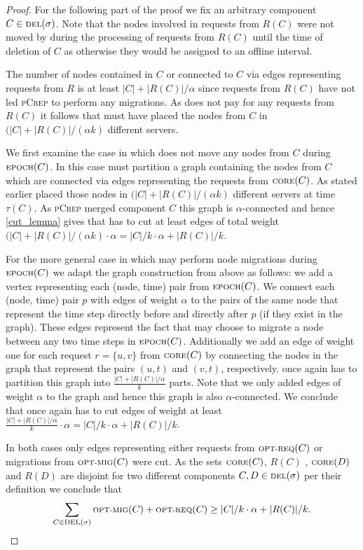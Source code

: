 \documentclass[a4paper,UKenglish,cleveref, autoref, thm-restate,authorcolumns]{lipics-v2019}
\newcommand{\adjDel}{\textsc{pCrep}}
\newcommand{\optmig}{\text{\scriptsize OPT-MIG}}
\newcommand{\optreq}{\text{\scriptsize OPT-REQ}}
\newcommand{\del}{\text{\scriptsize DEL}}
\newcommand{\opt}{\text{O{\scriptsize PT}}}
\newcommand{\core}{\text{\scriptsize CORE}}
\newcommand{\epoch}{\text{\scriptsize EPOCH}}
\begin{document}
\begin{proof}
	For the following part of the proof we fix an arbitrary component $C\in\del{}(\sigma)$. Note that the nodes involved in requests from $R(C)$ were not moved by \opt{} during the processing of requests from $R(C)$ until the time of deletion of $C$ as otherwise they would be assigned to an offline interval.
	
	The number of nodes contained in $C$ or connected to $C$ via edges representing requests from $R$ is at least $|C|+|R(C)|/\alpha$ since requests from $R(C)$ have not led \adjDel{} to perform any migrations. As \opt{} does not pay for any requests from $R(C)$ it follows that \opt{} must have placed the nodes from $C$ in $(|C|+|R(C)|/(\alpha k)$ different servers.
	
	We first examine the case in which \opt{} does not move any nodes from $C$ during $\epoch(C)$. In this case \opt{} must partition a graph containing the nodes from $C$ which are connected via edges representing the requests from $\core(C)$. As stated earlier \opt{} placed those nodes in $(|C|+|R(C)|/(\alpha k)$ different servers at time $\tau(C)$. As \adjDel{} merged component $C$ this graph is $\alpha$-connected and hence \cref{cut_lemma} gives that \opt{} has to cut at least edges of total weight $(|C|+|R(C)|/(\alpha k)\cdot\alpha=|C|/k\cdot\alpha+|R(C)|/k$.
	
	For the more general case in which \opt{} may perform node migrations during $\epoch(C)$ we adapt the graph construction from above as follows: we add a vertex representing each (node, time) pair from $\epoch(C)$.
	We connect each (node, time) pair $p$ with edges of weight $\alpha$ to the pairs of the same node that represent the time step directly before and directly after $p$ (if they exist in the graph). These edges represent the fact that \opt{} may choose to migrate a node between any two time steps in $\epoch(C)$.
	Additionally we add an edge of weight one for each request $r=\{u,v\}$ from $\core(C)$ by connecting the nodes in the graph that represent the pairs $(u,t)$ and $(v,t)$, respectively. \opt{} once again has to partition this graph into $\frac{|C|+|R(C)|/\alpha}{k}$ parts.
	Note that we only added edges of weight $\alpha$ to the graph and hence this graph is also $\alpha$-connected. We conclude that once again \opt{} has to cut edges of weight at least $\frac{|C|+|R(C)|/\alpha}{k}\cdot\alpha=|C|/k\cdot\alpha+|R(C)|/k$.
	
	In both cases only edges representing either requests from $\optreq(C)$ or migrations from $\optmig(C)$ were cut.
	As the sets $\core(C)$, $R(C)$ , $\core(D)$ and $R(D)$ are disjoint for two different components $C,D\in\del(\sigma)$ per their definition we conclude that
	\begin{align*}
	\sum_{C\in\del(\sigma)}\optmig(C)+\optreq(C)\geq |C|/k\cdot\alpha+|R(C)|/k.
	\end{align*}
\end{proof}
\end{document}
